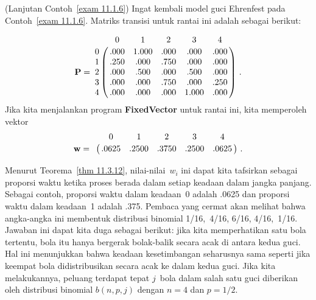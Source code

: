 \begin{example}\label{exam 11.3.4}(Lanjutan Contoh~\ref{exam 11.1.6})
Ingat kembali model guci Ehrenfest pada Contoh~\ref{exam 11.1.6}.
Matriks transisi untuk rantai ini adalah sebagai berikut:

$$
\mat {P} = \bordermatrix{
  & 0    & 1     &  2   & 3    & 4   \cr
0 & .000 & 1.000 & .000 & .000 & .000\cr
1 & .250 &  .000 & .750 & .000 & .000\cr
2 & .000 &  .500 & .000 & .500 & .000\cr
3 & .000 &  .000 & .750 & .000 & .250\cr
4 & .000 &  .000 & .000 &1.000 & .000}\ .
$$
Jika kita menjalankan program {\bf FixedVector} untuk rantai ini, kita
memperoleh vektor
$$
\mat {w} = \bordermatrix{ 
  &     0  &    1  &    2  &    3  &    4\cr
  & .0625  &.2500  &.3750  &.2500  &.0625}\ .
$$

Menurut Teorema~\ref{thm 11.3.12}, nilai-nilai~$w_i$ ini dapat kita tafsirkan
sebagai proporsi waktu ketika proses berada dalam setiap keadaan dalam jangka
panjang. Sebagai contoh, proporsi waktu dalam keadaan~0 adalah .0625 dan
proporsi waktu dalam keadaan~1 adalah .375. Pembaca yang cermat akan melihat
bahwa angka-angka ini membentuk distribusi binomial
1/16,~4/16, 6/16, 4/16,~1/16. Jawaban ini dapat kita duga sebagai berikut: jika
kita memperhatikan satu bola tertentu, bola itu hanya bergerak bolak-balik
secara acak di antara kedua guci. Hal ini menunjukkan bahwa keadaan
kesetimbangan seharusnya sama seperti jika keempat bola didistribusikan secara
acak ke dalam kedua guci. Jika kita melakukannya, peluang terdapat tepat
$j$~bola dalam salah satu guci diberikan oleh distribusi binomial $b(n,p,j)$
dengan $n = 4$ dan $p = 1/2$.
\end{example}

